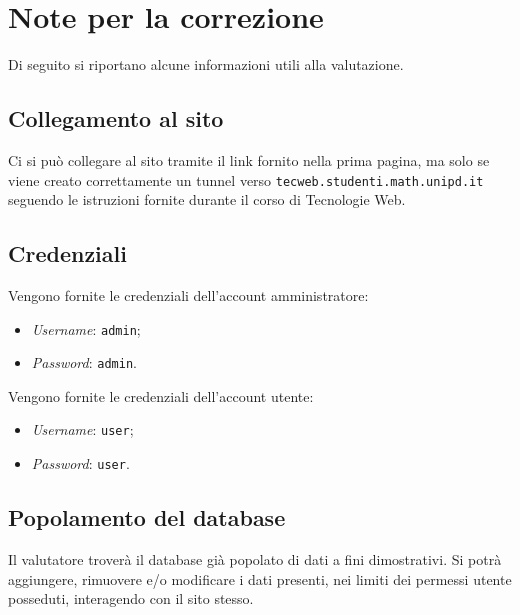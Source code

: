 \section{Note per la correzione}

Di seguito si riportano alcune informazioni utili alla valutazione.

\subsection{Collegamento al sito}
Ci si può collegare al sito tramite il link fornito nella prima pagina, ma
solo se viene creato correttamente un tunnel verso
\texttt{tecweb.studenti.math.unipd.it} seguendo le istruzioni fornite durante
il corso di Tecnologie Web.

\subsection{Credenziali}
Vengono fornite le credenziali dell'account amministratore:
\begin{itemize}
	\item \textit{Username}: \texttt{admin};
	\item \textit{Password}: \texttt{admin}.
\end{itemize}
Vengono fornite le credenziali dell'account utente:
\begin{itemize}
	\item \textit{Username}: \texttt{user};
	\item \textit{Password}: \texttt{user}.
\end{itemize}

\subsection{Popolamento del database}
Il valutatore troverà il database già popolato di dati a fini dimostrativi.
Si potrà aggiungere, rimuovere e/o modificare i dati presenti, nei limiti dei
permessi utente posseduti, interagendo con il sito stesso.

